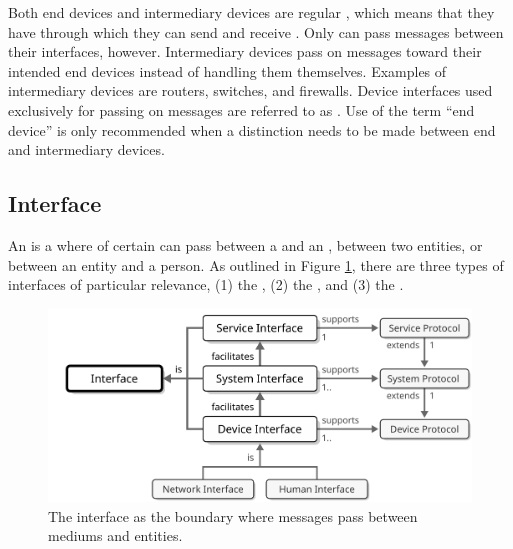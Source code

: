 Both end devices and intermediary devices are regular , which means that they have  through which they can send and receive .
Only  can pass messages between their interfaces, however.
Intermediary devices pass on messages toward their intended end devices instead of handling them themselves.
Examples of intermediary devices are routers, switches, and firewalls.
Device interfaces used exclusively for passing on messages are referred to as .
Use of the term ``end device'' is only recommended when a distinction needs to be made between end and intermediary devices.

\subsection{Interface}
\label{sec:reference-model:interface}

An  is a  where  of certain  can pass between a  and an , between two entities, or between an entity and a person.
As outlined in Figure \ref{fig:interface}, there are three types of interfaces of particular relevance, (1) the , (2) the , and (3) the .

\begin{figure}[ht!]
  \centering
  \includegraphics[scale=0.9]{figures/interface}
  \caption{
    The interface as the boundary where messages pass between mediums and entities.
  }
  \label{fig:interface}
\end{figure}

